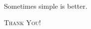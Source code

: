 \begin{frame}

	\pause

	\begin{center}
		Sometimes simple is better.
	\end{center}
\end{frame}

\begin{frame}
	\begin{center}
		\scshape \large Thank You!
	\end{center}
\end{frame}
